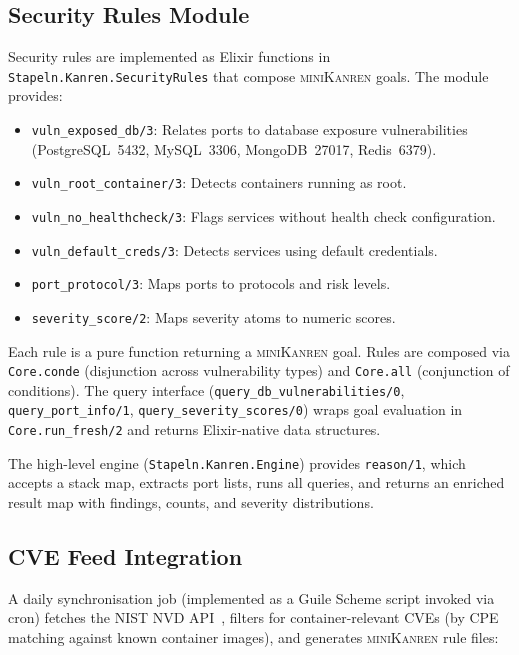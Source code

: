 \documentclass[11pt,twocolumn]{article}
\newcommand{\minikanren}{\textsc{miniKanren}\xspace}
\begin{document}
\subsection{Security Rules Module}
\label{sec:impl-rules}

Security rules are implemented as Elixir functions in
\texttt{Stapeln.Kanren.SecurityRules} that compose \minikanren goals.
The module provides:

\begin{itemize}[leftmargin=*]
\item \texttt{vuln\_exposed\_db/3}: Relates ports to database
      exposure vulnerabilities (PostgreSQL~5432, MySQL~3306,
      MongoDB~27017, Redis~6379).
\item \texttt{vuln\_root\_container/3}: Detects containers running
      as root.
\item \texttt{vuln\_no\_healthcheck/3}: Flags services without
      health check configuration.
\item \texttt{vuln\_default\_creds/3}: Detects services using
      default credentials.
\item \texttt{port\_protocol/3}: Maps ports to protocols and risk
      levels.
\item \texttt{severity\_score/2}: Maps severity atoms to numeric
      scores.
\end{itemize}

Each rule is a pure function returning a \minikanren goal. Rules are
composed via \texttt{Core.conde} (disjunction across vulnerability
types) and \texttt{Core.all} (conjunction of conditions). The query
interface (\texttt{query\_db\_vulnerabilities/0},
\texttt{query\_port\_info/1}, \texttt{query\_severity\_scores/0})
wraps goal evaluation in \texttt{Core.run\_fresh/2} and returns
Elixir-native data structures.

The high-level engine (\texttt{Stapeln.Kanren.Engine}) provides
\texttt{reason/1}, which accepts a stack map, extracts port lists,
runs all queries, and returns an enriched result map with findings,
counts, and severity distributions.

\subsection{CVE Feed Integration}
\label{sec:impl-cve}

A daily synchronisation job (implemented as a Guile Scheme script
invoked via cron) fetches the NIST NVD API~\cite{nvd2024}, filters
for container-relevant CVEs (by CPE matching against known container
images), and generates \minikanren rule files:
\end{document}
